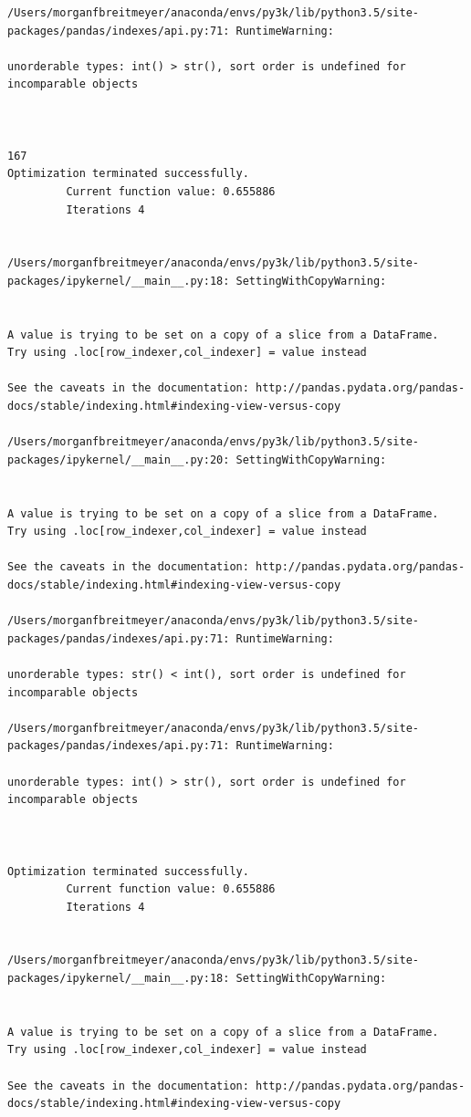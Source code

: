 \begin{lstlisting}
/Users/morganfbreitmeyer/anaconda/envs/py3k/lib/python3.5/site-packages/pandas/indexes/api.py:71: RuntimeWarning:

unorderable types: int() > str(), sort order is undefined for incomparable objects



167
Optimization terminated successfully.
         Current function value: 0.655886
         Iterations 4


/Users/morganfbreitmeyer/anaconda/envs/py3k/lib/python3.5/site-packages/ipykernel/__main__.py:18: SettingWithCopyWarning:


A value is trying to be set on a copy of a slice from a DataFrame.
Try using .loc[row_indexer,col_indexer] = value instead

See the caveats in the documentation: http://pandas.pydata.org/pandas-docs/stable/indexing.html#indexing-view-versus-copy

/Users/morganfbreitmeyer/anaconda/envs/py3k/lib/python3.5/site-packages/ipykernel/__main__.py:20: SettingWithCopyWarning:


A value is trying to be set on a copy of a slice from a DataFrame.
Try using .loc[row_indexer,col_indexer] = value instead

See the caveats in the documentation: http://pandas.pydata.org/pandas-docs/stable/indexing.html#indexing-view-versus-copy

/Users/morganfbreitmeyer/anaconda/envs/py3k/lib/python3.5/site-packages/pandas/indexes/api.py:71: RuntimeWarning:

unorderable types: str() < int(), sort order is undefined for incomparable objects

/Users/morganfbreitmeyer/anaconda/envs/py3k/lib/python3.5/site-packages/pandas/indexes/api.py:71: RuntimeWarning:

unorderable types: int() > str(), sort order is undefined for incomparable objects



Optimization terminated successfully.
         Current function value: 0.655886
         Iterations 4


/Users/morganfbreitmeyer/anaconda/envs/py3k/lib/python3.5/site-packages/ipykernel/__main__.py:18: SettingWithCopyWarning:


A value is trying to be set on a copy of a slice from a DataFrame.
Try using .loc[row_indexer,col_indexer] = value instead

See the caveats in the documentation: http://pandas.pydata.org/pandas-docs/stable/indexing.html#indexing-view-versus-copy


\end{lstlisting}
